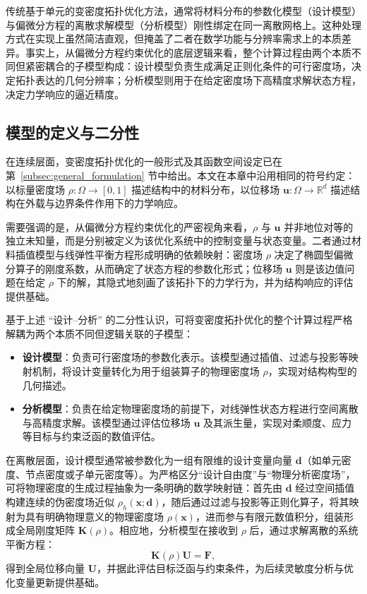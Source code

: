 传统基于单元的变密度拓扑优化方法，通常将材料分布的参数化模型（设计模型）与偏微分方程的离散求解模型（分析模型）刚性绑定在同一离散网格上。这种处理方式在实现上虽然简洁直观，但掩盖了二者在数学功能与分辨率需求上的本质差异。事实上，从偏微分方程约束优化的底层逻辑来看，整个计算过程由两个本质不同但紧密耦合的子模型构成：设计模型负责生成满足正则化条件的可行密度场，决定拓扑表达的几何分辨率；分析模型则用于在给定密度场下高精度求解状态方程，决定力学响应的逼近精度。


\subsection{模型的定义与二分性}
\label{subsec:model_definition_binarity}

在连续层面，变密度拓扑优化的一般形式及其函数空间设定已在第~\ref{subsec:general_formulation} 节中给出。本文在本章中沿用相同的符号约定：以标量密度场 $\rho:\Omega\rightarrow[0,1]$ 描述结构中的材料分布，以位移场 $\boldsymbol{u}:\Omega\rightarrow\mathbb{R}^{d}$ 描述结构在外载与边界条件作用下的力学响应。

需要强调的是，从偏微分方程约束优化的严密视角来看，$\rho$ 与 $\boldsymbol{u}$ 并非地位对等的独立未知量，而是分别被定义为该优化系统中的控制变量与状态变量。二者通过材料插值模型与线弹性平衡方程形成明确的依赖映射：密度场 $\rho$ 决定了椭圆型偏微分算子的刚度系数，从而确定了状态方程的参数化形式；位移场 $\boldsymbol{u}$ 则是该边值问题在给定 $\rho$ 下的解，其隐式地刻画了该拓扑下的力学行为，并为结构响应的评估提供基础。

基于上述 “设计{--}分析” 的二分性认识，可将变密度拓扑优化的整个计算过程严格解耦为两个本质不同但逻辑关联的子模型：
\begin{itemize}
	\item \textbf{设计模型}：负责可行密度场的参数化表示。该模型通过插值、过滤与投影等映射机制，将设计变量转化为用于组装算子的物理密度场 $\rho$，实现对结构构型的几何描述。
	
	\item \textbf{分析模型}：负责在给定物理密度场的前提下，对线弹性状态方程进行空间离散与高精度求解。该模型通过评估位移场 $\boldsymbol{u}$ 及其派生量，实现对柔顺度、应力等目标与约束泛函的数值评估。
\end{itemize}

在离散层面，设计模型通常被参数化为一组有限维的设计变量向量 $\boldsymbol{d}$（如单元密度、节点密度或子单元密度等）。为严格区分“设计自由度”与“物理分析密度场”，可将物理密度的生成过程抽象为一条明确的数学映射链：首先由 $\boldsymbol{d}$ 经过空间插值构建连续的伪密度场近似 $\rho_h(\boldsymbol{x};\boldsymbol{d})$，随后通过过滤与投影等正则化算子，将其映射为具有明确物理意义的物理密度场 $\rho(\boldsymbol{x})$，进而参与有限元数值积分，组装形成全局刚度矩阵 $\boldsymbol{K}(\rho)$。相应地，分析模型在接收到 $\rho$ 后，通过求解离散的系统平衡方程：
\[
\boldsymbol{K}(\rho)\boldsymbol{U} = \boldsymbol{F},
\]
得到全局位移向量 $\boldsymbol{U}$，并据此评估目标泛函与约束条件，为后续灵敏度分析与优化变量更新提供基础。

